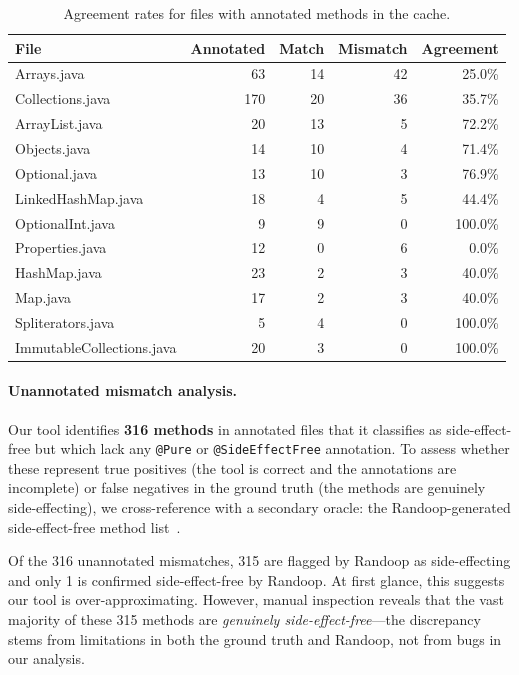 \begin{table}[h]
\centering
\caption{Agreement rates for files with annotated methods in the cache.}
\label{tab:per-file}
\begin{tabular}{lrrrr}
\toprule
\textbf{File} & \textbf{Annotated} & \textbf{Match} & \textbf{Mismatch} & \textbf{Agreement} \\
\midrule
Arrays.java               &  63 &  14 &  42 & 25.0\% \\
Collections.java          & 170 &  20 &  36 & 35.7\% \\
ArrayList.java            &  20 &  13 &   5 & 72.2\% \\
Objects.java              &  14 &  10 &   4 & 71.4\% \\
Optional.java             &  13 &  10 &   3 & 76.9\% \\
LinkedHashMap.java        &  18 &   4 &   5 & 44.4\% \\
OptionalInt.java          &   9 &   9 &   0 & 100.0\% \\
Properties.java           &  12 &   0 &   6 &  0.0\% \\
HashMap.java              &  23 &   2 &   3 & 40.0\% \\
Map.java                  &  17 &   2 &   3 & 40.0\% \\
Spliterators.java         &   5 &   4 &   0 & 100.0\% \\
ImmutableCollections.java &  20 &   3 &   0 & 100.0\% \\
\bottomrule
\end{tabular}
\end{table}


\paragraph{Unannotated mismatch analysis.}
Our tool identifies \textbf{316 methods} in annotated files that it classifies as side-effect-free but which lack any \texttt{@Pure} or \texttt{@SideEffectFree} annotation.
To assess whether these represent true positives (the tool is correct and the annotations are incomplete) or false negatives in the ground truth (the methods are genuinely side-effecting), we cross-reference with a secondary oracle: the Randoop-generated side-effect-free method list~\cite{randoop}.

Of the 316 unannotated mismatches, 315 are flagged by Randoop as side-effecting and only 1 is confirmed side-effect-free by Randoop.
At first glance, this suggests our tool is over-approximating.
However, manual inspection reveals that the vast majority of these 315 methods are \emph{genuinely side-effect-free}---the discrepancy stems from limitations in both the ground truth and Randoop, not from bugs in our analysis.

